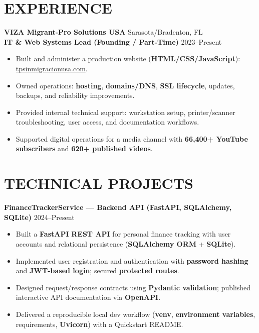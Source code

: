 \documentclass[10pt]{article}
\begin{document}
\section{EXPERIENCE}

\textbf{VIZA Migrant-Pro Solutions USA} \hfill Sarasota/Bradenton, FL\\
\textbf{IT \& Web Systems Lead (Founding / Part-Time)} \hfill 2023--Present
\begin{itemize}
  \small
  \item Built and administer a production website (\textbf{HTML/CSS/JavaScript}): \href{https://tpsinmigracionusa.com}{tpsinmigracionusa.com}.
  \item Owned operations: \textbf{hosting}, \textbf{domains/DNS}, \textbf{SSL lifecycle}, updates, backups, and reliability improvements.
  \item Provided internal technical support: workstation setup, printer/scanner troubleshooting, user access, and documentation workflows.
  \item Supported digital operations for a media channel with \textbf{66,400+ YouTube subscribers} and \textbf{620+ published videos}.
\end{itemize}
\normalsize

\section{TECHNICAL PROJECTS}

\textbf{FinanceTrackerService — Backend API (\textbf{FastAPI}, \textbf{SQLAlchemy}, \textbf{SQLite})} \hfill 2024--Present
\begin{itemize}
  \small
  \item Built a \textbf{FastAPI} \textbf{REST API} for personal finance tracking with user accounts and relational persistence (\textbf{SQLAlchemy ORM} + \textbf{SQLite}).
  \item Implemented user registration and authentication with \textbf{password hashing} and \textbf{JWT-based login}; secured \textbf{protected routes}.
  \item Designed request/response contracts using \textbf{Pydantic validation}; published interactive API documentation via \textbf{OpenAPI}.
  \item Delivered a reproducible local dev workflow (\textbf{venv}, \textbf{environment variables}, requirements, \textbf{Uvicorn}) with a Quickstart README.
\end{itemize}
\normalsize
\end{document}
